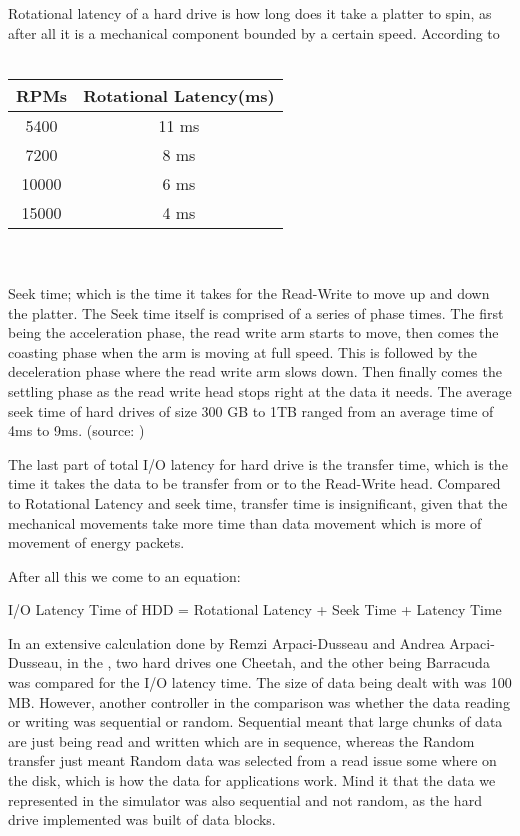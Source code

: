 \documentclass[12pt]{article}
\begin{document}
Rotational latency of a hard drive is how long does it take a platter to spin, as after all it is a mechanical
component bounded by a certain speed.
According to \cite{diskLatency} 
\\\\
\begin{tabular}{|c|c|}
  \hline
  RPMs & Rotational Latency(ms)\\
  \hline
  5400 & 11 ms\\
  \hline
  7200 & 8 ms\\
  \hline
  10000 & 6 ms\\
  \hline
  15000 & 4 ms\\
  \hline
\end {tabular}
\\\\
Seek time; which is the time it takes for the Read-Write to move up and down the platter.
The Seek time itself is comprised of a series of phase times. The first being the acceleration phase,
the read write arm starts to move, then comes the coasting phase when the arm is moving at full speed. This
is followed by the deceleration phase where the read write arm slows down. Then finally comes the
settling phase as the read write head stops right at the data it needs.
The average seek time of hard drives of size 300 GB to 1TB ranged from an average time of 4ms to 9ms.
(source: \cite{three} )

The last part of total I/O latency for hard drive is the transfer time, which is the time it takes the
data to be transfer from or to the Read-Write head. Compared to Rotational Latency and seek time, transfer
time is insignificant, given that the mechanical movements take more time than data movement which is more of
movement of energy packets.

After all this we come to an equation:

I/O Latency Time of HDD = Rotational Latency + Seek Time + Latency Time 

In an extensive calculation done by Remzi Arpaci-Dusseau and Andrea Arpaci-Dusseau, in the \cite{three},
two hard drives one Cheetah, and the other being Barracuda was compared for the I/O latency time. The size of
data being dealt with was 100 MB. However, another controller in the comparison was whether the data reading or writing
was sequential or random. Sequential meant that large chunks of data are just being read and written which are in
sequence, whereas the Random transfer just meant Random data was selected from a read issue some where on the disk,
which is how the data for applications work. Mind it that the data we represented in the simulator was also sequential
and not random, as the hard drive implemented was built of data blocks.
\end{document}
